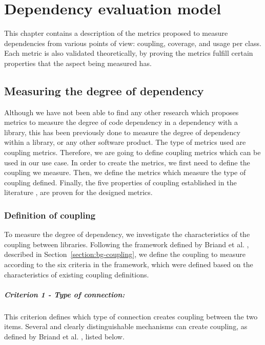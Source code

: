 \chapter{Dependency evaluation model}\label{ch:TheoreticModel}
This chapter contains a description of the metrics proposed to measure dependencies from various points of view: coupling, coverage, and usage per class. Each metric is also validated theoretically, by proving the metrics fulfill certain properties that the aspect being measured has.

\section{Measuring the degree of dependency}\label{sect:degree-dependency}
Although we have not been able to find any other research which proposes metrics to measure the degree of code dependency in a dependency with a library, this has been previously done to measure the degree of dependency within a library, or any other software product. The type of metrics used are coupling metrics. Therefore, we are going to define coupling metrics which can be used in our use case. In order to create the metrics, we first need to define the coupling we measure. Then, we define the metrics which measure the type of coupling defined. Finally, the five properties of coupling established in the literature \cite{briand1996property}, are proven for the designed metrics.

\subsection{Definition of coupling}\label{subsect:defCoupling}
To measure the degree of dependency, we investigate the characteristics of the coupling between libraries. Following the framework defined by Briand et al. \cite{briand1999unified}, described in Section~\ref{section:bg-coupling}, we define the coupling to measure according to the six criteria in the framework, which were defined based on the characteristics of existing coupling definitions.

\paragraph{Criterion 1 - Type of connection:}
This criterion defines which type of connection creates coupling between the two items. Several and clearly distinguishable mechanisms can create coupling, as defined by Briand et al. \cite{briand1999unified}, listed below.


